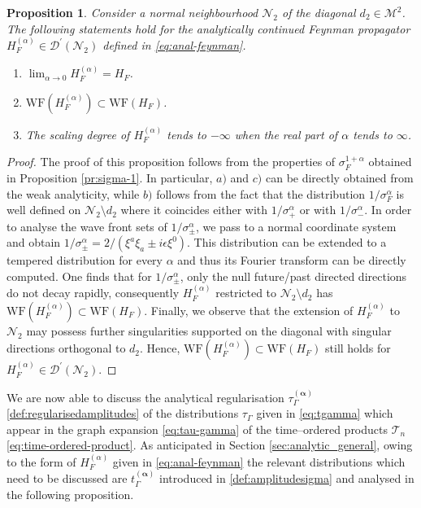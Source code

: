 \documentclass[a4paper,10pt,twoside]{article}
\numberwithin{equation}{section}
\newcounter{and}
\def\M{\mathcal{M}}
\def\N{\mathcal{N}}
\def\D{\mathcal{D}}
\def\WF{\mathrm{WF}}
\def\balpha{{\boldsymbol{\alpha}}}
\theoremstyle{plain}
\newtheorem{propo}[theo]{Proposition}
\theoremstyle{definition}
\begin{document}
\begin{propo}
Consider a normal neighbourhood $\N_2$ of the diagonal $d_2\in\M^2$. The following statements hold for the analytically continued Feynman propagator $H^{(\alpha)}_F\in\D^\prime(\N_2)$ defined in \eqref{eq:anal-feynman}.
\begin{enumerate}
\item $\lim_{\alpha\to 0}H^{(\alpha)}_F= H_F$. 
\item $\WF(H^{(\alpha)}_F) \subset \WF(H_F)$.
\item The scaling degree of $H^{(\alpha)}_F$ tends to $-\infty$ when the real part of $\alpha$ tends to $\infty$.  
\end{enumerate}
\end{propo}
\begin{proof}
The proof of this proposition follows from the properties of $\sigma_F^{1+\alpha}$ obtained in Proposition \ref{pr:sigma-1}. In particular, $a)$ and $c)$ can be directly obtained from the weak analyticity, while $b)$ follows from the fact that the distribution $1/\sigma_F^\alpha$ is well defined on $\N_2\setminus d_2$ where it coincides either with $1/\sigma_+^\alpha$ or with $1/\sigma_-^\alpha$. 
In order to analyse the wave front sets of $1/\sigma_\pm^\alpha$, we pass to a normal coordinate system and obtain $1/\sigma_\pm^\alpha=2/(\xi^a\xi_a\pm i\epsilon \xi^0)$. This distribution can be extended to a tempered  distribution for every $\alpha$ and thus its Fourier transform can be directly computed. One finds that for $1/\sigma_\pm^\alpha$, only the null future/past directed directions do not decay rapidly, consequently $H_F^{(\alpha)}$ restricted to $\N_2\setminus d_2$ has $\WF(H^{(\alpha)}_F)\subset \WF(H_F)$. Finally, we observe that the extension of $H^{(\alpha)}_F$ to $\N_2$ may possess further singularities supported on the diagonal with singular directions orthogonal to $d_2$. Hence, $\WF(H^{(\alpha)}_F)\subset \WF(H_F)$ still holds for $H_F^{(\alpha)}\in\D^\prime(\N_2)$.
\end{proof}

We are now able to discuss the analytical regularisation $\tau^{(\balpha)}_\Gamma$ \eqref{def:regularisedamplitudes} of the distributions $\tau_
\Gamma$ given in \eqref{eq:tgamma} which appear in the graph expansion  \eqref{eq:tau-gamma} of the time--ordered products $\mathcal{T}_n$ \eqref{eq:time-ordered-product}. As anticipated in Section \ref{sec:analytic_general}, owing to the form of $H^{(\alpha)}_F$ given in \eqref{eq:anal-feynman} the relevant distributions which need to be discussed are $t^{(\balpha)}_\Gamma$ introduced in \eqref{def:amplitudesigma} and analysed in the following proposition.
\end{document}
